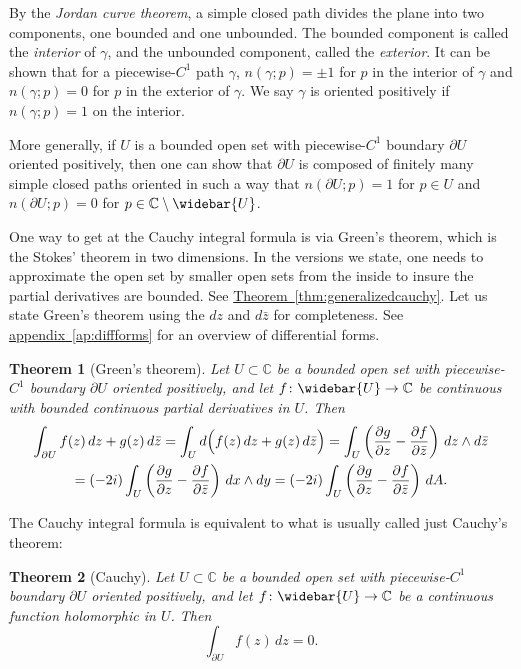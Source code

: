 \documentclass[12pt,openany]{book}
\newcommand{\C}{{\mathbb{C}}}
\newcommand{\myindex}[1]{#1\index{#1}}
\theoremstyle{plain}
\newtheorem{thm}{Theorem}[section]
\theoremstyle{remark}
\theoremstyle{definition}
\theoremstyle{exercise}
\theoremstyle{example}
\newcommand{\appendixref}[1]{\hyperref[#1]{appendix~\ref*{#1}}}
\newcommand{\thmref}[1]{\hyperref[#1]{Theorem~\ref*{#1}}}
\begin{document}
By the \emph{\myindex{Jordan curve theorem}}, a simple closed path
divides the plane into two components, one bounded and one unbounded.
The bounded component is called the \emph{\myindex{interior}} of $\gamma$,
and the unbounded component, called the \emph{\myindex{exterior}}.
It can be shown that for a piecewise-$C^1$ path $\gamma$,
$n(\gamma;p) = \pm 1$ for $p$ in the interior of
$\gamma$ and $n(\gamma;p) = 0$ for $p$ in the exterior of $\gamma$.
We say $\gamma$ is oriented positively if $n(\gamma;p) = 1$ on the interior.

More generally, if $U$ is a bounded open set with piecewise-$C^1$ boundary
$\partial U$ oriented positively, then one can show that $\partial U$
is composed of finitely
many simple closed paths oriented in such a way that $n(\partial U;p) = 1$
for $p \in U$ and $n(\partial U;p) = 0$ for $p \in \C \setminus \widebar{U}$.


One way to get at the Cauchy integral formula is via Green's theorem,
which is the Stokes' theorem
in two dimensions.  In the versions we state, one needs to
approximate the open set by smaller open sets from the inside to insure
the partial derivatives are bounded.  See
\thmref{thm:generalizedcauchy}.  Let us state Green's theorem using
the $dz$ and $d\bar{z}$ for completeness.  See \appendixref{ap:diffforms}
for an overview of differential forms.

\begin{thm}[Green's theorem] \label{thm:greens}
Let $U \subset \C$ be a bounded open set with piecewise-$C^1$ boundary
$\partial U$ oriented positively, and let
$f \colon \widebar{U} \to \C$ be continuous
with bounded continuous partial derivatives in $U$.
Then
\begin{multline*}
\int_{\partial U} f(z) \, dz + g(z) \, d\bar{z}
=
\int_{U} d \Bigl( f(z) \, dz + g(z) \, d\bar{z} \Bigr)
=
\int_{U}
\left(
\frac{\partial g}{\partial z}
-
\frac{\partial f}{\partial \bar{z}}
\right)
\, dz \wedge d\bar{z}
\\
=
(-2i)
\int_{U}
\left(
\frac{\partial g}{\partial z}
-
\frac{\partial f}{\partial \bar{z}}
\right)
\, dx \wedge dy
=
(-2i)
\int_{U}
\left(
\frac{\partial g}{\partial z}
-
\frac{\partial f}{\partial \bar{z}}
\right)
\, dA.
\end{multline*}
\end{thm}

The Cauchy integral formula is equivalent to
what is usually called just Cauchy's theorem:

\begin{thm}[Cauchy]
Let $U \subset \C$ be a bounded open set with piecewise-$C^1$ boundary
$\partial U$ oriented positively, and let
$f \colon \widebar{U} \to \C$ be a continuous function
holomorphic in $U$.  Then
\begin{equation*}
\int_{\partial U}
f(z) \, dz = 0 .
\end{equation*}
\end{thm}
\end{document}

